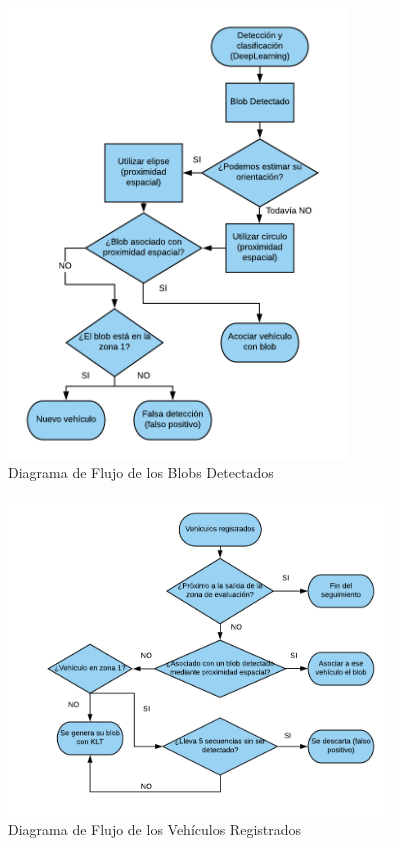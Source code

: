 \begin{figure}[H] 
\begin{center}
	\includegraphics[width=0.8\textwidth]{figures/Diseno_global/diagrama_flujo.png}
   \caption{Diagrama de Flujo de  los Blobs Detectados}
	\label{fig.diagrama_flujo_blob}
\end{center}
\end{figure}

\begin{figure}[H] 
\begin{center}
	\includegraphics[width=0.9\textwidth]{figures/Diseno_global/diagrama_flujo1.png}
   \caption{Diagrama de Flujo de  los Vehículos Registrados}
	\label{fig.diagrama_flujo_vehiculos}
\end{center}
\end{figure}


